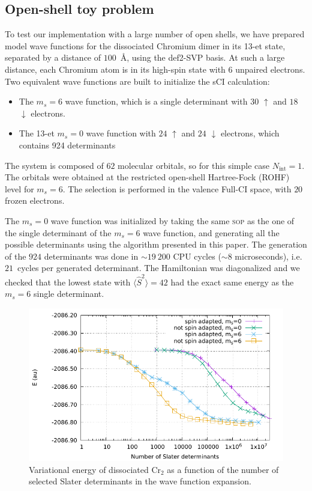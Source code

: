 \documentclass[aip,jcp,reprint,showkeys]{revtex4-1}
\newcommand{\stwo}{\hat{S}^2}
\newcommand{\up}{\uparrow}
\newcommand{\dn}{\downarrow}
\newcommand{\Nint}{{N_\text{int}}}
\newcommand{\sop}{\textsc{sop}}
\begin{document}
\subsection{Open-shell toy problem}

To test our implementation with a large number of open shells, we have prepared
model wave functions for the dissociated Chromium dimer in its 13-et state, separated by a
distance of $100$~\AA, using the def2-SVP basis.\cite{Weigend_2005}
At such a large distance, each Chromium atom is in its high-spin state with $6$
unpaired electrons. Two equivalent wave functions are built to initialize the sCI
calculation:
\begin{itemize}
\item The $m_s=6$ wave function, which is a single determinant with $30$ $\up$
      and $18$ $\dn$ electrons.
\item The 13-et $m_s=0$ wave function with $24$ $\up$ and $24$ $\dn$ electrons, which
      contains 924 determinants
\end{itemize}
The system is composed of $62$ molecular orbitals, so for this simple case $\Nint=1$.
The orbitals were obtained at the restricted open-shell Hartree-Fock (ROHF) level
for $m_s=6$.
The selection is performed in the valence Full-CI space, with $20$ frozen electrons.

The $m_s=0$ wave function was initialized by taking the same {\sop} as the
one of the single determinant of the $m_s=6$ wave function, and generating all
the possible determinants using the algorithm presented in this paper.
The generation of the $924$ determinants was done in $\sim 19~200$
CPU cycles ($\sim8$ microseconds), i.e.  $21$~cycles per generated determinant. The Hamiltonian was
diagonalized and we checked that the lowest state with $\langle \stwo \rangle =
42$ had the exact same energy as the $m_s=6$ single determinant.

\begin{figure}
\includegraphics[width=0.9\columnwidth]{e_var_ndet}
\caption{Variational energy of dissociated Cr$_2$ as a function of the number of
selected Slater determinants in the wave function expansion.}
\label{fig:e_var_ndet}
\end{figure}
\end{document}
